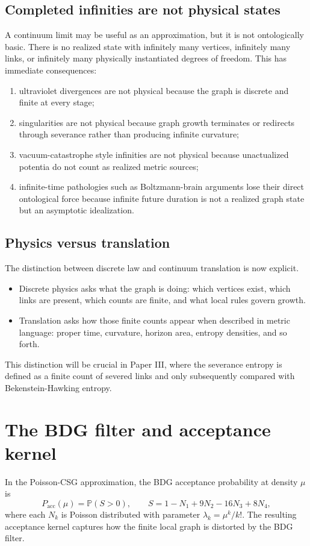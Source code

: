 \documentclass[11pt]{article}
\newcommand{\Pacc}{P_{\mathrm{acc}}}
\begin{document}
\subsection{Completed infinities are not physical states}
A continuum limit may be useful as an approximation, but it is not ontologically basic. There is no realized state with infinitely many vertices, infinitely many links, or infinitely many physically instantiated degrees of freedom. This has immediate consequences:
\begin{enumerate}[label=(\alph*)]
    \item ultraviolet divergences are not physical because the graph is discrete and finite at every stage;
    \item singularities are not physical because graph growth terminates or redirects through severance rather than producing infinite curvature;
    \item vacuum-catastrophe style infinities are not physical because unactualized potentia do not count as realized metric sources;
    \item infinite-time pathologies such as Boltzmann-brain arguments lose their direct ontological force because infinite future duration is not a realized graph state but an asymptotic idealization.
\end{enumerate}

\subsection{Physics versus translation}
The distinction between discrete law and continuum translation is now explicit.
\begin{itemize}
    \item Discrete physics asks what the graph is doing: which vertices exist, which links are present, which counts are finite, and what local rules govern growth.
    \item Translation asks how those finite counts appear when described in metric language: proper time, curvature, horizon area, entropy densities, and so forth.
\end{itemize}
This distinction will be crucial in Paper III, where the severance entropy is defined as a finite count of severed links and only subsequently compared with Bekenstein-Hawking entropy.

\section{The BDG filter and acceptance kernel}
In the Poisson-CSG approximation, the BDG acceptance probability at density $\mu$ is
\[
\Pacc(\mu)=\mathbb{P}(S>0), \qquad S=1-N_1+9N_2-16N_3+8N_4,
\]
where each $N_k$ is Poisson distributed with parameter $\lambda_k=\mu^k/k!$. The resulting acceptance kernel captures how the finite local graph is distorted by the BDG filter.
\end{document}
